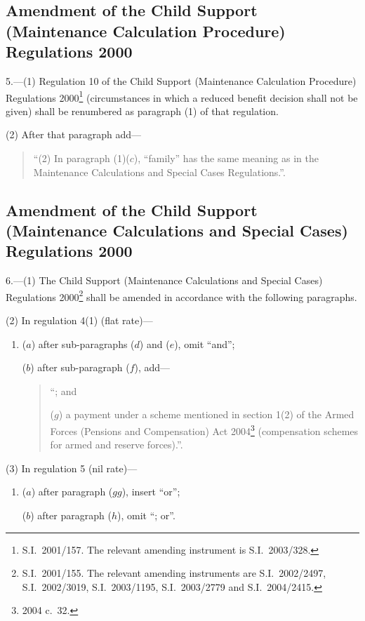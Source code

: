 \documentclass[12pt,a4paper]{article}
\begin{document}
\subsection[5. Amendment of the Child Support (Maintenance Calculation Procedure) Regulations 2000]{Amendment of the Child Support (Maintenance Calculation Procedure) Regulations 2000}

5.---(1)  Regulation 10 of the Child Support (Maintenance Calculation Procedure) Regulations 2000\footnote{S.I.\ 2001/157. The relevant amending instrument is S.I.\ 2003/328.} (circumstances in which a reduced benefit decision shall not be given) shall be renumbered as paragraph (1) of that regulation.

(2) After that paragraph add—
\begin{quotation}
“(2) In paragraph (1)($c$), “family” has the same meaning as in the Maintenance Calculations and Special Cases Regulations.”.
\end{quotation}

\subsection[6. Amendment of the Child Support (Maintenance Calculations and Special Cases) Regulations 2000]{Amendment of the Child Support (Maintenance Calculations and Special Cases) Regulations 2000}

6.---(1)  The Child Support (Maintenance Calculations and Special Cases) Regulations 2000\footnote{S.I.\ 2001/155. The relevant amending instruments are S.I.\ 2002/2497, S.I.\ 2002/3019, S.I.\ 2003/1195, S.I.\ 2003/2779 and S.I.\ 2004/2415.} shall be amended in accordance with the following paragraphs.

(2) In regulation 4(1) (flat rate)—
\begin{enumerate}\item[]
($a$) after sub-paragraphs ($d$)  and ($e$), omit “and”;

($b$) after sub-paragraph ($f$), add—
\begin{quotation}
“; and

($g$) a payment under a scheme mentioned in section 1(2) of the Armed Forces (Pensions and Compensation) Act 2004\footnote{2004 c.\ 32.} (compensation schemes for armed and reserve forces).”.
\end{quotation}
\end{enumerate}

(3) In regulation 5 (nil rate)—
\begin{enumerate}\item[]
($a$) after paragraph ($gg$), insert “or”;

($b$) after paragraph ($h$), omit “; or”.
\end{enumerate}
\end{document}
